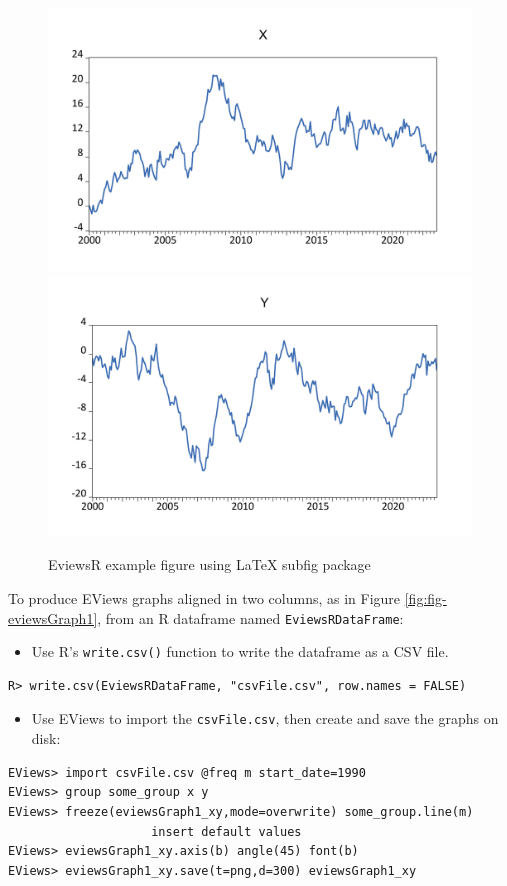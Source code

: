 \begin{figure}

{\centering \includegraphics[width=0.45\linewidth,height=0.15\textheight]{figures/eviewsgraph-eviewsr-x} \includegraphics[width=0.45\linewidth,height=0.15\textheight]{figures/eviewsgraph-eviewsr-y} 

}

\caption{EviewsR example figure using \LaTeX{} subfig package}\label{fig:fig-eviewsGraph}
\end{figure}

To produce EViews graphs aligned in two columns, as in Figure \ref{fig:fig-eviewsGraph1}, from an R dataframe named \texttt{EviewsRDataFrame}:

\begin{itemize}
\tightlist
\item
  Use R's \texttt{write.csv()} function to write the dataframe as a CSV file.
\end{itemize}

\begin{verbatim}
R> write.csv(EviewsRDataFrame, "csvFile.csv", row.names = FALSE)
\end{verbatim}

\begin{itemize}
\tightlist
\item
  Use EViews to import the \texttt{csvFile.csv}, then create and save the graphs on disk:
\end{itemize}

\begin{verbatim}
EViews> import csvFile.csv @freq m start_date=1990
EViews> group some_group x y
EViews> freeze(eviewsGraph1_xy,mode=overwrite) some_group.line(m)
                    insert default values
EViews> eviewsGraph1_xy.axis(b) angle(45) font(b)
EViews> eviewsGraph1_xy.save(t=png,d=300) eviewsGraph1_xy
\end{verbatim}

